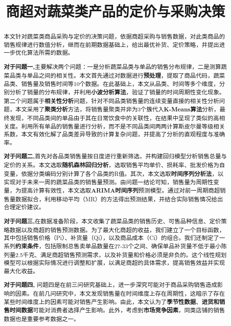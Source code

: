 \documentclass[withoutpreface,bwprint]{cumcmthesis} %
\title{商超对蔬菜类产品的定价与采购决策}
\begin{document}
		\maketitle
		\begin{abstract}
	本文针对蔬菜类商品采购与定价的决策问题，依据商超采购与销售数据，对此类商品的销售规律进行数值分析，继而在前期数据基础上，给出最优补货、定价策略，并提出进一步优化算法所需的数据。
	
	\textbf{对于问题一,}主要解决两个问题：一是分析蔬菜品类与单品的销售分布规律，二是测算蔬菜品类与单品之间的相关性。本文首先通过对数据进行\textbf{预处理}，提取了商品代码，蔬菜品类、销售量及销售时间等10个数据。在此基础上，本文从品类、时间等多个维度，分别分析了销量的分布规律，并利用\textbf{小波分析算法}，验证了销量的时间周期性变化现象。第二个问题属于\textbf{相关性分析}问题，针对不同品类销售量的连续变量直接的相关性分析问题，本文采用了\textbf{聚类分析}方法，将销售量聚类并非为3个簇代入\textbf{K-Means算法}分析，最终发现，不同品类间的单品由于其在日常饮食中的关联性，在结果中呈现了类似的高相关度。利用所有单品的销售量进行分析，而不是不同品类间两两计算斯皮尔曼等级相关系数，本文有效化解了品类差异导致的计算复杂问题，并提高了分析的直观程度与准确率。
	
	\textbf{对于问题二,}首先对各品类销售量按日度进行重新筛选，并构建回归模型分析销售总量与定价的关系。本文选取\textbf{随机森林回归分析}，选取销售平均单价、损耗率、批发价格为自变量，依据分类编码分别计算了各个品类的R值。其次，本文选取\textbf{时间序列分析法}，以实现对于未来一周的蔬菜品类的销售量预测。由问题一结论可知，销售量为周期性变量，为提高计算有效性，本文选取\textbf{ARIMA时间序列}预测模型。通过对前一周期商超销售量数据拟合，利用移动平均（MR）的方法得出预测结果，并结合实际销售情况给出合理定价建议。
	
	\textbf{对于问题三,}在数据准备阶段，本文收集了蔬菜品类的销售历史、可售品种信息、定价策略数据以及商超的销售预测数据。为了最大化商超的收益，我们建立了一个目标函数，其中包括销售价格（Pi）、补货量（Qi），以及商品成本（Ci）的组合。我们还制定了一系列\textbf{约束条件}，包括限制总售卖单品数量在27-33个之间、确保单品补货量不低于最小陈列量2.5千克、满足商超销售预测需求，以及补货量和价格必须是非负的。这个线性规划模型可以根据实际情况进行调整和扩展，以满足商超的具体需求，提高销售效益并实现最大化收益。
	
	
	\textbf{对于问题四,}
		问题四是在前三问研究基础上，进一步深究可能对于商品采购销售造成影响的因素。在前几问研究中，本文发现销售量在时间维度上存在周期性，这暗示了存在某些时间维度上的因素可能对销售产生影响。由此，本文认为了\textbf{季节性数据}、\textbf{进货和销售时间数据}可能对消费者选择产生影响。此外，考虑到\textbf{市场竞争因素}，同类店铺的销售数据也是重要参考数据之一。
		\end{abstract}
		
\end{document}
